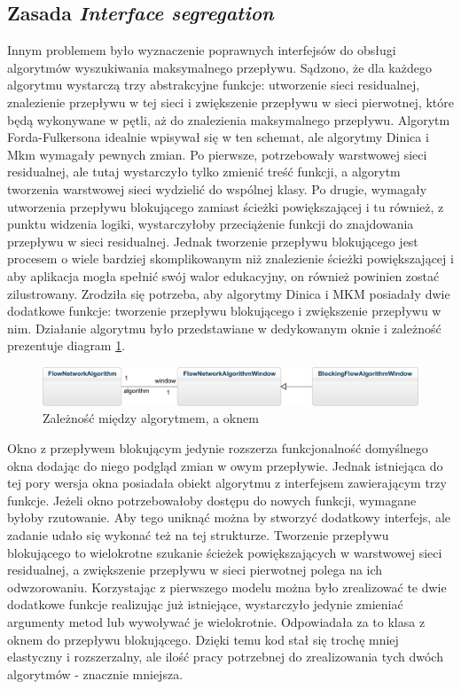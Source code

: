 \subsection{Zasada \textit{Interface segregation}}
Innym problemem było wyznaczenie poprawnych interfejsów do obsługi algorytmów wyszukiwania maksymalnego przepływu. Sądzono, że dla każdego algorytmu wystarczą trzy abstrakcyjne funkcje: utworzenie sieci residualnej, znalezienie przepływu w tej sieci i zwiększenie przepływu w sieci pierwotnej, które będą wykonywane w pętli, aż do znalezienia maksymalnego przepływu. Algorytm Forda-Fulkersona idealnie wpisywał się w ten schemat, ale algorytmy Dinica i Mkm wymagały pewnych zmian. Po pierwsze, potrzebowały warstwowej sieci residualnej, ale tutaj wystarczyło tylko zmienić treść funkcji, a algorytm tworzenia warstwowej sieci wydzielić do wspólnej klasy. Po drugie, wymagały utworzenia przepływu blokującego zamiast ścieżki powiększającej i tu również, z punktu widzenia logiki, wystarczyłoby przeciążenie funkcji do znajdowania przepływu w sieci residualnej. Jednak tworzenie przepływu blokującego jest procesem o wiele bardziej skomplikowanym niż znalezienie ścieżki powiększającej i aby aplikacja mogła spełnić swój walor edukacyjny, on również powinien zostać zilustrowany. Zrodziła się potrzeba, aby algorytmy Dinica i MKM posiadały dwie dodatkowe funkcje: tworzenie przepływu blokującego i zwiększenie przepływu w nim. Działanie algorytmu było przedstawiane w dedykowanym oknie i zależność prezentuje diagram \ref{fig:algorytmOknoModel}.
\begin{figure}
	\centering
	\includegraphics[width=0.8\linewidth]{./img/algWindowModel}
	\caption{Zależność między algorytmem, a oknem}
	\label{fig:algorytmOknoModel}
\end{figure}
Okno z przepływem blokującym jedynie rozszerza funkcjonalność domyślnego okna dodając do niego podgląd zmian w owym przepływie. Jednak istniejąca do tej pory wersja okna posiadała obiekt algorytmu z interfejsem zawierającym trzy funkcje. Jeżeli okno potrzebowałoby dostępu do nowych funkcji, wymagane byłoby rzutowanie. Aby tego uniknąć można by stworzyć dodatkowy interfejs, ale zadanie udało się wykonać też na tej strukturze. Tworzenie przepływu blokującego to wielokrotne szukanie ścieżek powiększających w warstwowej sieci residualnej, a zwiększenie przepływu w sieci pierwotnej polega na ich odwzorowaniu. Korzystając z pierwszego modelu można było zrealizować te dwie dodatkowe funkcje realizując już istniejące, wystarczyło jedynie zmieniać argumenty metod lub wywoływać je wielokrotnie. Odpowiadała za to klasa z oknem do przepływu blokującego. Dzięki temu kod stał się trochę mniej elastyczny i rozszerzalny, ale ilość pracy potrzebnej do zrealizowania tych dwóch algorytmów - znacznie mniejsza.
